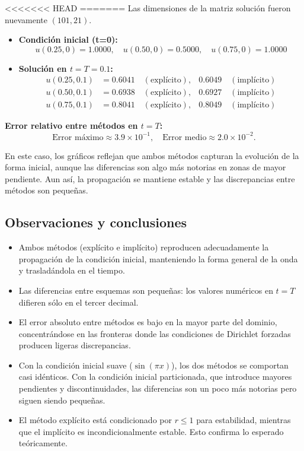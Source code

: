 \documentclass[12pt,a4paper]{article}
\begin{document}
<<<<<<< HEAD
=======
Las dimensiones de la matriz solución fueron nuevamente $(101,21)$.

\begin{itemize}
    \item \textbf{Condición inicial (t=0):}
    \[
    u(0.25,0) = 1.0000, \quad u(0.50,0) = 0.5000, \quad u(0.75,0) = 1.0000
    \]

    \item \textbf{Solución en $t = T = 0.1$:}
    \begin{align*}
    u(0.25,0.1) &= 0.6041 \quad (\text{explícito}), & 0.6049 \quad (\text{implícito}) \\
    u(0.50,0.1) &= 0.6938 \quad (\text{explícito}), & 0.6927 \quad (\text{implícito}) \\
    u(0.75,0.1) &= 0.8041 \quad (\text{explícito}), & 0.8049 \quad (\text{implícito})
    \end{align*}
\end{itemize}

\textbf{Error relativo entre métodos en $t=T$:}
\[
\text{Error máximo} \approx 3.9 \times 10^{-1}, \quad \text{Error medio} \approx 2.0 \times 10^{-2}.
\]

En este caso, los gráficos reflejan que ambos métodos capturan la evolución de la forma inicial, aunque las diferencias son algo más notorias en zonas de mayor pendiente.  
Aun así, la propagación se mantiene estable y las discrepancias entre métodos son pequeñas.

\subsection{Observaciones y conclusiones}

\begin{itemize}
    \item Ambos métodos (explícito e implícito) reproducen adecuadamente la propagación de la condición inicial, manteniendo la forma general de la onda y trasladándola en el tiempo.
    \item Las diferencias entre esquemas son pequeñas: los valores numéricos en $t=T$ difieren sólo en el tercer decimal.
    \item El error absoluto entre métodos es bajo en la mayor parte del dominio, concentrándose en las fronteras donde las condiciones de Dirichlet forzadas producen ligeras discrepancias.
    \item Con la condición inicial suave ($\sin(\pi x)$), los dos métodos se comportan casi idénticos. Con la condición inicial particionada, que introduce mayores pendientes y discontinuidades, las diferencias son un poco más notorias pero siguen siendo pequeñas.
    \item El método explícito está condicionado por $r \leq 1$ para estabilidad, mientras que el implícito es incondicionalmente estable. Esto confirma lo esperado teóricamente.
\end{itemize}
\end{document}
